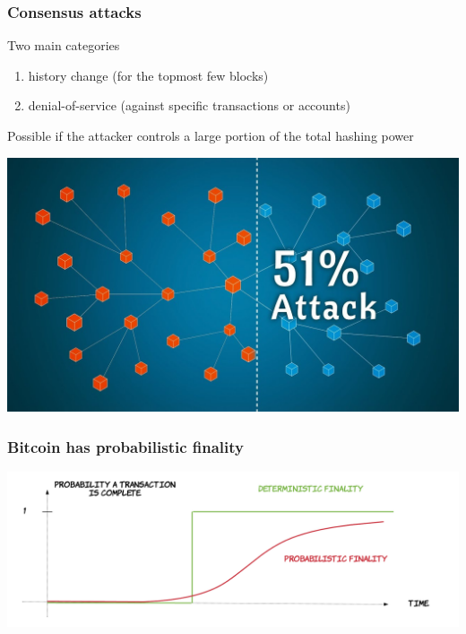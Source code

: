 \documentclass[11pt]{beamer}  %
\begin{document}
\begin{frame}\frametitle{Consensus attacks}

  \begin{greenbox}{Two main categories}
    \begin{enumerate}
    \item history change (for the topmost few blocks)
    \item denial-of-service (against specific transactions or accounts)
    \end{enumerate}
  \end{greenbox}

  \bigskip

  Possible if the attacker controls a large portion of the total hashing power

  \begin{center}
    \includegraphics[scale=0.17,clip=false]{pictures/51-percenters.jpg}
  \end{center}

\end{frame}

\begin{frame}\frametitle{Bitcoin has probabilistic finality}

  \begin{center}
    \includegraphics[width=\textwidth,clip=false]{pictures/finality.png}
  \end{center}

\end{frame}
\end{document}
